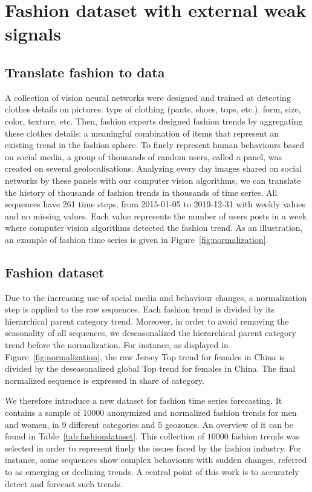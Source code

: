 \documentclass[review]{elsarticle}
\newcommand{\numberts}{10000}
\begin{document}
\section{Fashion dataset with external weak signals}
\label{sec:dataset}

\subsection{Translate fashion to data}
\label{sec:dataset:a}
A collection of vision neural networks were designed and trained  at detecting clothes details on pictures: type of clothing (pants, shoes, tops, etc.), form, size, color, texture, etc. Then, fashion experts designed fashion trends by aggregating these clothes details: a meaningful combination of items that represent an existing trend in the fashion sphere. To finely represent human behaviours based on social media, a group of thousands of random users, called a panel, was created on several geolocalisations. Analyzing every day images shared on social networks by these panels with our computer vision algorithms, we can translate the history of thousands of fashion trends in thousands of time series.  All sequences have 261 time steps, from 2015-01-05 to 2019-12-31 with weekly values and no missing values. Each value represents the number of users posts in a week where computer vision algorithms detected the fashion trend.  As an illustration, an example of fashion time series is given in Figure~\ref{fig:normalization}.

\subsection{Fashion dataset}
\label{sec:dataset:b}

Due to the increasing use of social media and behaviour changes, a normalization step is applied to the raw sequences. Each fashion trend is divided by its hierarchical parent category trend. Moreover, in order to avoid removing the seasonality of all sequences, we deseasonalized the hierarchical parent category trend before the normalization. For instance, as displayed in Figure~\ref{fig:normalization}, the raw Jersey Top trend for females in China is divided by the deseasonalized global Top trend for females in China. The final normalized sequence is expressed in share of category.

We therefore introduce a new dataset for fashion time series forecasting.  It contains a sample of $\numberts$ anonymized and  normalized fashion trends for men and women, in 9 different categories and 5 geozones. An overview of it can be found in Table~\ref{tab:fashiondataset}. This collection of $\numberts$ fashion trends was selected in order to represent finely the issues faced by the fashion industry. For instance, some sequences show complex behaviours with sudden changes, referred to as emerging or declining trends. A central point of this work is to accurately detect and forecast such trends.
\end{document}
